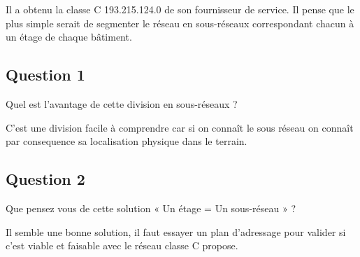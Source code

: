 \documentclass{article}
\begin{document}
Il a obtenu la classe C 193.215.124.0 de son fournisseur de service. Il pense que le plus simple serait de segmenter le réseau en sous-réseaux correspondant chacun à un étage de chaque bâtiment.


\subsection*{Question 1}
\begin{exercise}
    Quel est l'avantage de cette division en sous-réseaux ?
\end{exercise}
\begin{resolution}
    C'est une division facile à comprendre car si on connaît le sous réseau on connaît par consequence sa localisation physique dans le terrain.
\end{resolution}

\subsection*{Question 2}
\begin{exercise}
    Que pensez vous de cette solution « Un étage = Un sous-réseau » ?
\end{exercise}
\begin{resolution}
    Il semble une bonne solution, il faut essayer un plan d'adressage pour valider si c'est viable et faisable avec le réseau classe C propose.
\end{resolution}

\newpage
\end{document}
